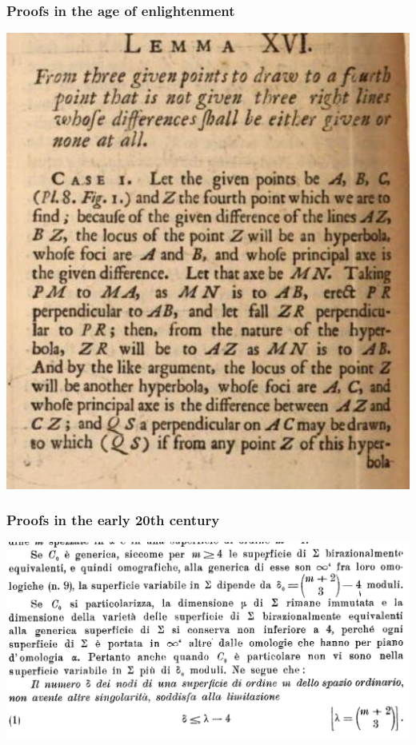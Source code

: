\documentclass{beamer}
\begin{document}
\begin{frame}
    \frametitle{Proofs in the age of enlightenment}
    \begin{center}
        \includegraphics[scale=.4]{img/mathematica.png}
    \end{center}
\end{frame}

\begin{frame}
    \frametitle{Proofs in the early 20th century}
    \begin{center}
        \includegraphics[scale=.35]{img/severi.png}
    \end{center}
\end{frame}
\end{document}
